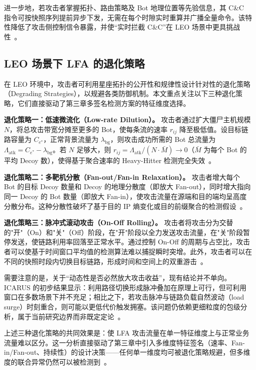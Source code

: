 进一步地，若攻击者掌握拓扑、路由策略及 Bot 地理位置等先验信息，其 C\&C 指令可按快照序列提前异步下发，无需在每个时隙实时重算并广播全量命令。该特性降低了攻击侧控制信令暴露，并使“实时拦截 C\&C”在 LEO 场景中更具挑战性~\cite{icarus}。

\subsection{LEO 场景下 LFA 的退化策略}

在 LEO 环境中，攻击者可利用星座拓扑的公开性和规律性设计针对性的退化策略（Degrading Strategies），以规避各类防御机制。本文重点关注以下三种退化策略，它们直接驱动了第三章多签名检测方案的特征维度选择。

\textbf{退化策略一：低速微流化（Low-rate Dilution）。} 攻击者通过扩大僵尸主机规模 $N$，将总攻击带宽分摊至更多的 Bot，使每条流的速率 $r_{ij}$ 降至极低值。设目标链路容量为 $C_{e^*}$，正常背景流量为 $\lambda_{\text{bg}}$，则攻击成功所需的 Bot 总流量为 $\Lambda_{\text{atk}} = C_{e^*} - \lambda_{\text{bg}}$。若 $N$ 足够大，则 $r_{ij} = \Lambda_{\text{atk}} / (N \cdot \bar{M}) \to 0$（$\bar{M}$ 为每个 Bot 的平均 Decoy 数），使得基于聚合速率的 Heavy-Hitter 检测完全失效~\cite{crossfire, ripple}。

\textbf{退化策略二：多靶机分散（Fan-out/Fan-in Relaxation）。} 攻击者增大每个 Bot 的目标 Decoy 数量和 Decoy 的地理分散度（即放大 Fan-out），同时增大指向同一 Decoy 的 Bot 数量（即放大 Fan-in），使攻击流量在源端和目的端均呈高度分散分布。这种分散性破坏了基于目的 IP 熵变化或目的前缀聚合的检测假设~\cite{crossfire}。

\textbf{退化策略三：脉冲式滚动攻击（On-Off Rolling）。} 攻击者将攻击分为交替的"开"（On）和"关"（Off）阶段，在"开"阶段以全力发送攻击流量，在"关"阶段暂停发送，使链路利用率回落至正常水平。通过控制 On-Off 的周期与占空比，攻击者可以使基于时间窗口平均值的检测算法难以捕捉瞬时突增。此外，攻击者可以在不同的快照时段内切换目标链路，形成时间和空间上的双重游击~\cite{icarus, dosat}。

需要注意的是，关于“动态性是否必然放大攻击收益”，现有结论并不单向。ICARUS 的初步结果显示：利用路径切换形成脉冲叠加在原理上可行，但可利用窗口在多数场景下并不充足；相比之下，若攻击脉冲与链路负载自然波动（load surge）时刻重合，则可能以更低代价触发拥塞。该问题仍依赖更细粒度的包级分析，属于当前研究边界而非既定定论~\cite{icarus, rasti2015temporal_lensing}。

上述三种退化策略的共同效果是：使 LFA 攻击流量在单一特征维度上与正常业务流量难以区分。这一分析直接驱动了第三章中引入多维度特征签名（速率、Fan-in/Fan-out、持续性）的设计决策——任何单一维度均可被退化策略规避，但多维度的联合异常仍然可以被检测到~\cite{satshield}。


